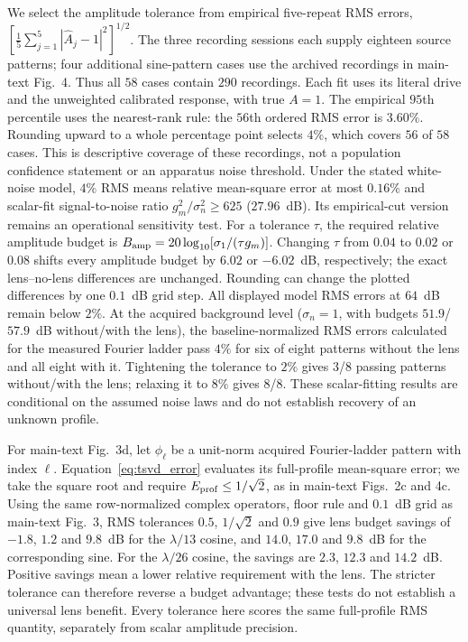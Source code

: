 \documentclass[pdflatex,sn-nature]{sn-jnl}%
\begin{document}
We select the amplitude tolerance from empirical five-repeat RMS errors, $[\frac15\sum_{j=1}^5|\hat A_j-1|^2]^{1/2}$. The three recording sessions each supply eighteen source patterns; four additional sine-pattern cases use the archived recordings in main-text Fig.~4. Thus all $58$ cases contain $290$ recordings. Each fit uses its literal drive and the unweighted calibrated response, with true $A=1$. The empirical $95$th percentile uses the nearest-rank rule: the $56$th ordered RMS error is $3.60\%$. Rounding upward to a whole percentage point selects $4\%$, which covers $56$ of $58$ cases. This is descriptive coverage of these recordings, not a population confidence statement or an apparatus noise threshold. Under the stated white-noise model, $4\%$ RMS means relative mean-square error at most $0.16\%$ and scalar-fit signal-to-noise ratio $g_m^2/\sigma_n^2\ge625$ ($27.96$~dB). Its empirical-cut version remains an operational sensitivity test.
For a tolerance $\tau$, the required relative amplitude budget is $B_{\rm amp}=20\log_{10}[\sigma_1/(\tau g_m)]$.
Changing $\tau$ from $0.04$ to $0.02$ or $0.08$ shifts every amplitude budget by $6.02$ or $-6.02$~dB, respectively; the exact lens--no-lens differences are unchanged. Rounding can change the plotted differences by one $0.1$~dB grid step.
All displayed model RMS errors at $64$~dB remain below $2\%$. At the acquired background level ($\sigma_n=1$, with budgets $51.9$/$57.9$~dB without/with the lens), the baseline-normalized RMS errors calculated for the measured Fourier ladder pass $4\%$ for six of eight patterns without the lens and all eight with it. Tightening the tolerance to $2\%$ gives $3$/$8$ passing patterns without/with the lens; relaxing it to $8\%$ gives $8$/$8$. These scalar-fitting results are conditional on the assumed noise laws and do not establish recovery of an unknown profile.

For main-text Fig.~3d, let $\phi_\ell$ be a unit-norm acquired Fourier-ladder pattern with index $\ell$.
Equation~\eqref{eq:tsvd_error} evaluates its full-profile mean-square error;
we take the square root and require $E_{\rm prof}\le1/\sqrt2$, as in
main-text Figs.~2c and 4c. Using the same row-normalized complex operators,
floor rule and $0.1$~dB grid as main-text Fig.~3, RMS tolerances $0.5$, $1/\sqrt2$ and $0.9$
give lens budget savings of $-1.8$, $1.2$ and $9.8$~dB for the
$\lambda/13$ cosine, and $14.0$, $17.0$ and $9.8$~dB for the corresponding sine.
For the $\lambda/26$ cosine, the savings are $2.3$, $12.3$ and $14.2$~dB.
Positive savings mean a lower relative requirement with the lens.
The stricter tolerance can therefore reverse a budget advantage; these tests
do not establish a universal lens benefit. Every tolerance here scores the
same full-profile RMS quantity, separately from scalar amplitude precision.
\end{document}
